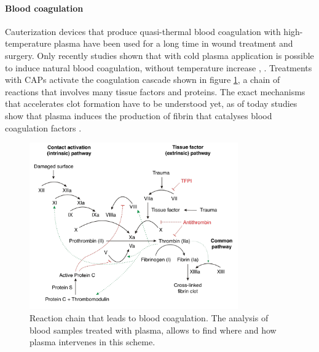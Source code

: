 \paragraph{Blood coagulation}
Cauterization devices that produce quasi-thermal blood coagulation with high-temperature plasma have been used for a long time in wound treatment and surgery. Only recently studies shown that with cold plasma application is possible to induce natural blood coagulation, without temperature increase \cite{Fridman2006}, \cite{4343167}.
Treatments with CAPs activate the coagulation cascade shown in figure \ref{fig:coag}, a chain of reactions that involves many tissue factors and proteins. The exact mechanisms that accelerates clot formation have to be understood yet, as of today studies show that plasma induces the production of fibrin that catalyses blood coagulation factors \cite{plmed_review}.
\begin{figure}
 \centering
 \includegraphics[width=0.8\textwidth]{Images/Intro/coag_map.png}
 \caption{Reaction chain that leads to blood coagulation. The analysis of blood samples treated with plasma, allows to find where and how plasma intervenes in this scheme.}
 \label{fig:coag}
\end{figure}



